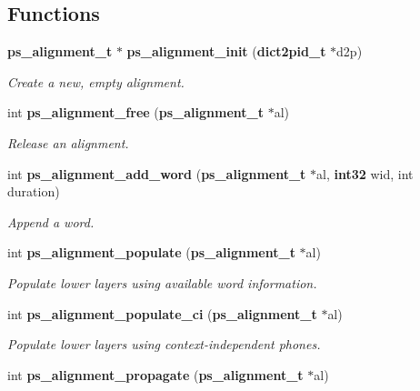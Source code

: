 \subsection*{\-Functions}
\begin{DoxyCompactItemize}
\item 
{\bf ps\-\_\-alignment\-\_\-t} $\ast$ {\bf ps\-\_\-alignment\-\_\-init} ({\bf dict2pid\-\_\-t} $\ast$d2p)\label{ps__alignment_8c_abe7668d9a53be1401896623ed42f02be}

\begin{DoxyCompactList}\small\item\em \-Create a new, empty alignment. \end{DoxyCompactList}\item 
int {\bf ps\-\_\-alignment\-\_\-free} ({\bf ps\-\_\-alignment\-\_\-t} $\ast$al)\label{ps__alignment_8c_ab8fa505f155e38d7e6f8b7dbbd070282}

\begin{DoxyCompactList}\small\item\em \-Release an alignment. \end{DoxyCompactList}\item 
int {\bf ps\-\_\-alignment\-\_\-add\-\_\-word} ({\bf ps\-\_\-alignment\-\_\-t} $\ast$al, {\bf int32} wid, int duration)\label{ps__alignment_8c_ab6264685976a8270971c86deae7a488e}

\begin{DoxyCompactList}\small\item\em \-Append a word. \end{DoxyCompactList}\item 
int {\bf ps\-\_\-alignment\-\_\-populate} ({\bf ps\-\_\-alignment\-\_\-t} $\ast$al)\label{ps__alignment_8c_a59e81853dad3d935755dcb309d8cc926}

\begin{DoxyCompactList}\small\item\em \-Populate lower layers using available word information. \end{DoxyCompactList}\item 
int {\bf ps\-\_\-alignment\-\_\-populate\-\_\-ci} ({\bf ps\-\_\-alignment\-\_\-t} $\ast$al)\label{ps__alignment_8c_ae17f691c36070955e32a2c987910acde}

\begin{DoxyCompactList}\small\item\em \-Populate lower layers using context-\/independent phones. \end{DoxyCompactList}\item 
int {\bf ps\-\_\-alignment\-\_\-propagate} ({\bf ps\-\_\-alignment\-\_\-t} $\ast$al)\label{ps__alignment_8c_adc8ea5411f8500a0affcec636d65fa8d}


\end{DoxyCompactItemize}
